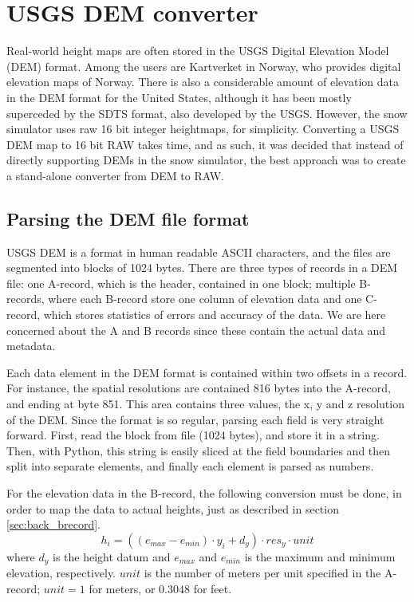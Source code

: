 \section{USGS DEM converter}
Real-world height maps are often stored in the USGS Digital Elevation Model (DEM) format. Among the users are Kartverket in Norway, who provides digital elevation maps of Norway. There is also a considerable amount of elevation data in the DEM format for the United States, although it has been mostly superceded by the SDTS format, also developed by the USGS\cite{wiki_usgsdem}. However, the snow simulator uses raw 16 bit integer heightmaps, for simplicity. Converting a USGS DEM map to 16 bit RAW takes time, and as such, it was decided that instead of directly supporting DEMs in the snow simulator, the best approach was to create a stand-alone converter from DEM to RAW.


\subsection{Parsing the DEM file format}
USGS DEM is a format in human readable ASCII characters, and the files are segmented into blocks of 1024 bytes. There are three types of records in a DEM file: one A-record, which is the header, contained in one block; multiple B-records, where each B-record store one column of elevation data and one C-record, which stores statistics of errors and accuracy of the data. We are here concerned about the A and B records since these contain the actual data and metadata. 

Each data element in the DEM format is contained within two offsets in a record. For instance, the spatial resolutions are contained 816 bytes into the A-record, and ending at byte 851. This area contains three values, the x, y and z resolution of the DEM. Since the format is so regular, parsing each field is very straight forward. First, read the block from file (1024 bytes), and store it in a string. Then, with Python, this string is easily sliced at the field boundaries and then split into separate elements, and finally each element is parsed as numbers.

For the elevation data in the B-record, the following conversion must be done, in order to map the data to actual heights, just as described in section \ref{sec:back_brecord}.
$$
h_i = ((e_{max}-e_{min})\cdot y_i+ d_y)\cdot res_y \cdot unit
$$
where $d_y$ is the height datum and $e_{max}$ and $e_{min}$ is the maximum and minimum elevation, respectively. $unit$ is the number of meters per unit specified in the A-record; $unit=1$ for meters, or $0.3048$ for feet.


